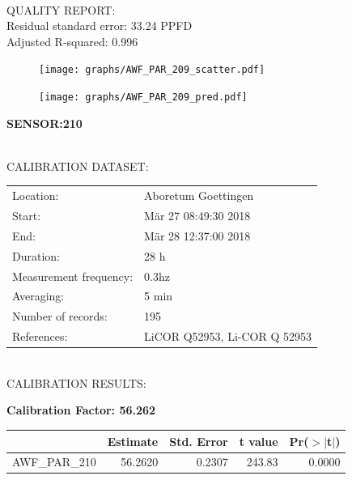 \documentclass[oneside]{report}
\begin{document}
\hrulefill\\
QUALITY REPORT:\\
Residual standard error: 33.24 PPFD\\
Adjusted R-squared: 0.996



\begin{figure}[H]
  \centering
  \texttt{[image: graphs/AWF\_PAR\_209\_scatter.pdf]}
\end{figure}




\begin{figure}[H]
  \centering
  \texttt{[image: graphs/AWF\_PAR\_209\_pred.pdf]}
\end{figure}

\pagebreak


\begin{center}
\large{\textbf{SENSOR:210}}\\
\end{center}

\hrulefill\\
CALIBRATION DATASET:\\
\begin{table}[h!]
  \centering
  \label{tab:table1}
  \begin{tabular}{ll}
    Location: & Aboretum Goettingen\\ 
    
    
    Start:  & Mär 27 08:49:30 2018 \\
    End:   & Mär 28 12:37:00 2018\\ 
    Duration: & 28 h\\
    Measurement frequency: & 0.3hz\\
    Averaging:  &5 min\\
    Number of records: & 195 \\
    References: & LiCOR Q52953, Li-COR Q 52953 \\
  \end{tabular}
\end{table}

\hrulefill\\
CALIBRATION RESULTS:\\


\begin{center}
\textbf{\large{Calibration Factor: 56.262}}\\
\end{center}
\begin{table}[ht]
\centering
\begin{tabular}{rrrrr}
  \hline
 & Estimate & Std. Error & t value & Pr($>$$|$t$|$) \\ 
  \hline
AWF\_PAR\_210 & 56.2620 & 0.2307 & 243.83 & 0.0000 \\ 
   \hline
\end{tabular}
\end{table}
\end{document}
